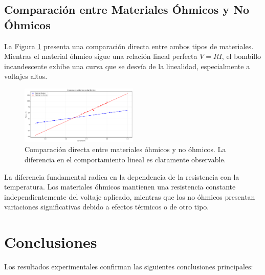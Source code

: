 \documentclass[11pt,twocolumn]{article}
\begin{document}
\subsection*{Comparación entre Materiales Óhmicos y No Óhmicos}

La Figura \ref{fig:comparacion} presenta una comparación directa entre ambos tipos de materiales. Mientras el material óhmico sigue una relación lineal perfecta $V = RI$, el bombillo incandescente exhibe una curva que se desvía de la linealidad, especialmente a voltajes altos.

\begin{figure}[H]
\centering
\includegraphics[width=0.5\textwidth]{graficas/comparacion_ohmico_vs_no_ohmico.png}
\caption{Comparación directa entre materiales óhmicos y no óhmicos. La diferencia en el comportamiento lineal es claramente observable.}
\label{fig:comparacion}
\end{figure}

La diferencia fundamental radica en la dependencia de la resistencia con la temperatura. Los materiales óhmicos mantienen una resistencia constante independientemente del voltaje aplicado, mientras que los no óhmicos presentan variaciones significativas debido a efectos térmicos o de otro tipo.

\section{Conclusiones}

Los resultados experimentales confirman las siguientes conclusiones principales:
\end{document}
